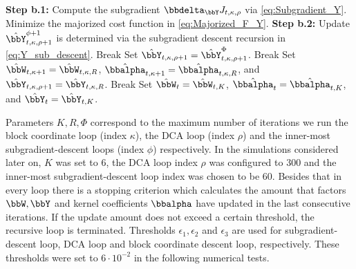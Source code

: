 \documentclass[10pt,final]{IEEEtran}
\begin{document}
\begin{algorithm}
\begin{algorithmic}[1]
		    \STATE \textbf{Step b.1:}  Compute the subgradient $\bbdelta_{\bbY}J_{t,\kappa,\rho}$ via 
              \eqref{eq:Subgradient_Y}.
		\STATE Minimize the majorized cost function in 
		\eqref{eq:Majorized_F_Y}.
	       \STATE \textbf{Step b.2:} Update 
  $\hat{\bbY}_{t,\kappa,\rho+1}^{\phi+1}$ is determined via the subgradient descent recursion in \eqref{eq:Y_sub_descent}.
		        \STATE Break
		    \ENDIF
		    \ENDFOR
		    \STATE Set $\hat{\bbY}_{t,\kappa,\rho+1}=\hat{\bbY}_{t,\kappa,\rho+1}^{\Phi}$.
		        \STATE Break
		    \ENDIF
	    \ENDFOR
	    \STATE Set $\hat{\bbW}_{t,\kappa+1}=\hat{\bbW}_{t,\kappa,R}$, $\hat{\bbalpha}_{t,\kappa+1}=\hat{\bbalpha}_{t,\kappa,R}$, and  $\hat{\bbY}_{t,\kappa,\rho+1}=\hat{\bbY}_{t,\kappa,R}$.
		    \STATE Break
		    \ENDIF
	\ENDFOR
	\STATE Set $\hat{\bbW}_{t}=\hat{\bbW}_{t,K}$, $\hat{\bbalpha}_{t}=\hat{\bbalpha}_{t,K}$, and  $\hat{\bbY}_{t}=\hat{\bbY}_{t,K}$.
\ENDFOR
\end{algorithmic}
\end{algorithm}

Parameters $K,R,\Phi$ correspond to the maximum number of iterations we run the block coordinate loop (index $\kappa$), the DCA loop (index $\rho$) and the inner-most subgradient-descent loops (index $\phi$) respectively. In the simulations considered later on, $K$ was set to 6, the DCA loop index $\rho$ was configured to 300 and the inner-most subgradient-descent loop index was chosen to be 60. Besides that in every loop there is a stopping criterion which calculates the amount that factors $\bbW,\bbY$ and kernel coefficients $\bbalpha$ have updated in the last consecutive iterations. If the update amount does not exceed a certain threshold, the recursive loop is terminated. Thresholds $\epsilon_1,\epsilon_2$ and $\epsilon_3$ are used for subgradient-descent loop, DCA loop and block coordinate descent loop, respectively. These thresholds were set to $6\cdot10^{-2}$ in the following numerical tests.
\end{document}
